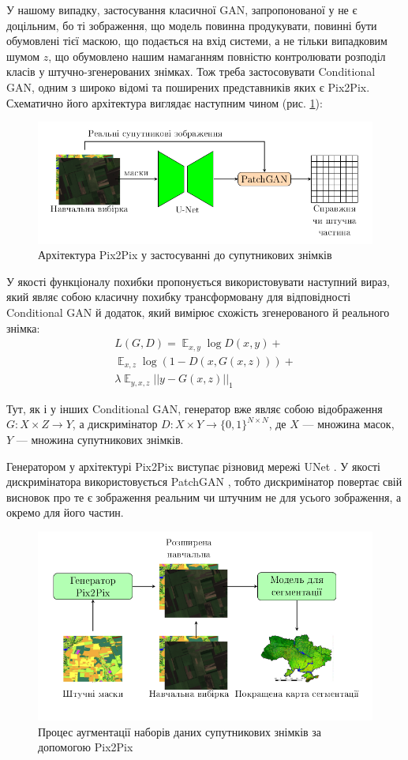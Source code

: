 \documentclass{ConfFTI}
\DeclareMathOperator{\E}{\mathbb{E}}
\begin{document}
У нашому випадку, застосування класичної GAN, запропонованої
у \cite{pix2pix} не є доцільним, бо ті зображення,
що модель повинна продукувати, повинні бути обумовлені
тієї маскою, що подається на вхід системи,
а не тільки випадковим шумом $z$, що обумовлено нашим
намаганням повністю контролювати розподіл класів
у штучно-згенерованих знімках. Тож треба
застосовувати Conditional GAN, одним з широко відомі та поширених
представників яких є Pix2Pix. Схематично його
архітектура виглядає наступним чином (рис. \ref{fig:pix2pix}):

\begin{figure}[ht]
	\centering
	\includegraphics[width= 0.49 \textwidth]{pix2pix.png}
	\caption{Архітектура Pix2Pix у застосуванні до супутникових знімків}
	\label{fig:pix2pix}
\end{figure}

У якості функціоналу похибки пропонується використовувати наступний вираз, який являє собою
класичну похибку трансформовану для відповідності Conditional GAN й додаток, який
вимірює схожість згенерованого й реального знімка:
\begin{multline*}
	L(G, D) = \E_{x, y} \log D(x,y) + \\
	\E_{x, z} \log (1 - D(x, G(x, z))) + \\
	\lambda \E_{y, x, z} ||y - G(x, z)||_1
\end{multline*}

Тут, як і у інших Conditional GAN, генератор вже являє собою відображення
$G: X \times Z \rightarrow Y$, а дискримінатор $D: X \times Y \rightarrow \{0, 1\}^{N \times N}$,
де $X$ --- множина масок, $Y$ --- множина супутникових знімків.

Генератором у архітектурі Pix2Pix виступає різновид
мережі UNet \cite{unet}. У якості дискримінатора використовується PatchGAN \cite{pix2pix}, тобто
дискримінатор повертає свій висновок про те є зображення реальним чи штучним не для
усього зображення, а окремо для його частин.

\begin{figure}[ht]
	\centering
	\includegraphics[width=0.49 \textwidth]{pipline.png}
	\caption{Процес аугментації наборів даних супутникових знімків за допомогою Pix2Pix}
	\label{fig:pipline}
\end{figure}
\end{document}
